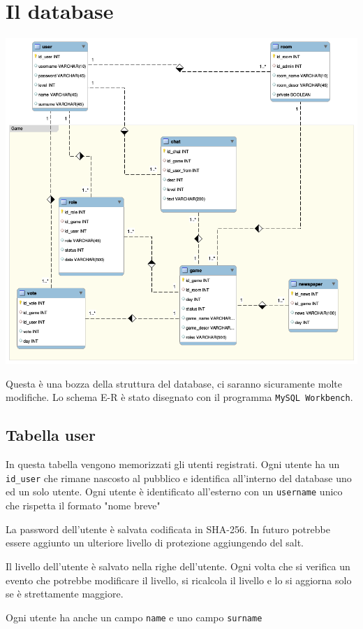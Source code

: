 \documentclass[10pt,a4paper]{article}
\begin{document}
\section{Il database}
\includegraphics[width = \textwidth]{database.png}

Questa è una bozza della struttura del database, ci saranno sicuramente molte modifiche. Lo schema E-R è stato disegnato con il programma \texttt{MySQL Workbench}.

\subsection{Tabella user}
In questa tabella vengono memorizzati gli utenti registrati. Ogni utente ha un \texttt{id\_user} che rimane nascosto al pubblico e identifica all'interno del database uno ed un solo utente. Ogni utente è identificato all'esterno con un \texttt{username} unico che rispetta il formato "nome breve"

La password dell'utente è salvata codificata in SHA-256. In futuro potrebbe essere aggiunto un ulteriore livello di protezione aggiungendo del salt.

Il livello dell'utente è salvato nella righe dell'utente. Ogni volta che si verifica un evento che potrebbe modificare il livello, si ricalcola il livello e lo si aggiorna solo se è strettamente maggiore.

Ogni utente ha anche un campo \texttt{name} e uno campo \texttt{surname}
\end{document}
